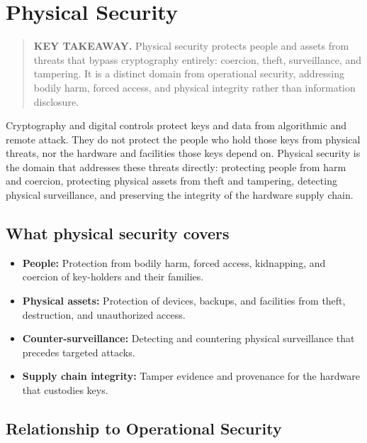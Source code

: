 
\chapter{Physical Security}\label{physical-security}

\begin{quote}
\textbf{KEY TAKEAWAY.} Physical security protects people and assets from threats that bypass cryptography entirely: coercion, theft, surveillance, and tampering. It is a distinct domain from operational security, addressing bodily harm, forced access, and physical integrity rather than information disclosure.
\end{quote}

Cryptography and digital controls protect keys and data from algorithmic and remote attack. They do not protect the people who hold those keys from physical threats, nor the hardware and facilities those keys depend on. Physical security is the domain that addresses these threats directly: protecting people from harm and coercion, protecting physical assets from theft and tampering, detecting physical surveillance, and preserving the integrity of the hardware supply chain.

\section{What physical security covers}\label{what-physical-security-covers}

\begin{itemize}
\tightlist
\item
  \textbf{People:} Protection from bodily harm, forced access, kidnapping, and coercion of key-holders and their families.
\item
  \textbf{Physical assets:} Protection of devices, backups, and facilities from theft, destruction, and unauthorized access.
\item
  \textbf{Counter-surveillance:} Detecting and countering physical surveillance that precedes targeted attacks.
\item
  \textbf{Supply chain integrity:} Tamper evidence and provenance for the hardware that custodies keys.
\end{itemize}

\section{Relationship to Operational Security}\label{relationship-to-operational-security}

